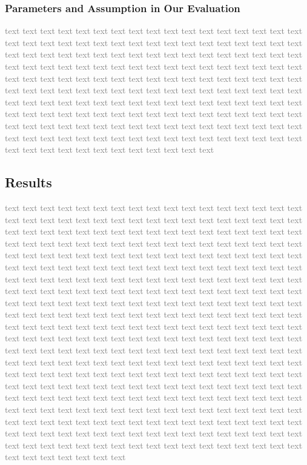 \documentclass[sigconf]{acmart}
\begin{document}
\subsubsection{Parameters and Assumption in Our Evaluation}
\textcolor{gray}{
    text text text text text text text text text text text text text text text text text text text text text text text text text text text text text text text text text text text text text text text text text text text text text text text text text text text text text text text text text text text text text text text text text text text text text text text text text text text text text text text text text text text text text text text text text text text text text text text text text text text text text text text text text text text text text text text text text text text text text text text text text text text text text text text text text text text text text text text text text text text text text text text text text text text text text text text text text text text text text text text text text text text text text text text text text text text text text text text text text text text text text text
}

\subsection{Results}
\textcolor{gray}{
    text text text text text text text text text text text text text text text text text text text text text text text text text text text text text text text text text text text text text text text text text text text text text text text text text text text text text text text text text text text text text text text text text text text text text text text text text text text text text text text text text text text text text text text text text text text text text text text text text text text text text text text text text text text text text text text text text text text text text text text text text text text text text text text text text text text text text text text text text text text text text text text text text text text text text text text text text text text text text text text text text text text text text text text text text text text text text text text text text text text text text text
    text text text text text text text text text text text text text text text text text text text text text text text text text text text text text text text text text text text text text text text text text text text text text text text text text text text text text text text text text text text text text text text text text text text text text text text text text text text text text text text text text text text text text text text text text text text text text text text text text text text text text text text text text text text text text text text text text text text text text text text text text text text text text text text text text text text text text text text text text text text text text text text text text text text text text text text text text text text text text text text text text text text text text text text text text text text text text text text text text text text text text text
}
\end{document}
